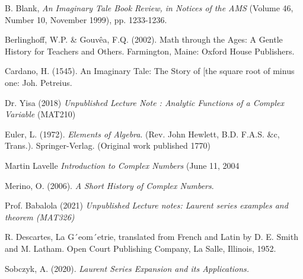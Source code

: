 \documentclass[11pt]{report}
\begin{document}
	
	\begin{description}
		
		\item 	B. Blank, \emph{An Imaginary  Tale Book Review, in Notices of the AMS }(Volume 46, Number 10,
		November 1999), pp. 1233-1236.
			\item Berlinghoff, W.P. \& Gouvêa, F.Q. (2002). Math through the Ages: A Gentle History for
		Teachers and Others. Farmington, Maine: Oxford House Publishers.

			\item	Cardano, H. (1545). An Imaginary Tale: The Story of [the square root of minus one: Joh. Petreius. 
				\item 	Dr. Yisa (2018) \emph { Unpublished Lecture Note : Analytic Functions of a Complex Variable }(MAT210)
				\item Euler, L. (1972). \emph { Elements of Algebra}. (Rev. John Hewlett, B.D. F.A.S. \&c, Trans.). Springer-Verlag. (Original work published 1770)
				
		\item Martin Lavelle \emph{Introduction to Complex Numbers
		}(June 11, 2004 
		
		\item Merino, O. (2006).\emph{ A Short History of Complex Numbers}.
			\item Prof. Babalola (2021)\emph{ Unpublished Lecture notes: Laurent series examples and theorem (MAT326)}
		\item R. Descartes, La G´eom´etrie, translated from French and Latin by D. E. Smith and M.
		Latham. Open Court Publishing Company, La Salle, Illinois, 1952.
		\item 	Sobczyk, A. (2020). \emph{Laurent Series Expansion and its Applications.}
	
	\end{description}
	
\end{document}
